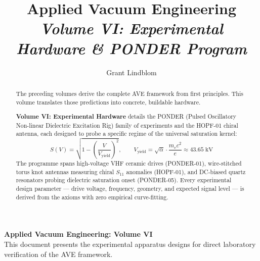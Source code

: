\title{\textbf{Applied Vacuum Engineering} \\ \large \textit{Volume VI: Experimental Hardware \& PONDER Program}}
\author{Grant Lindblom}
\date{}

\maketitle

\vfill
\noindent\textbf{Applied Vacuum Engineering: Volume VI} \\
This document presents the experimental apparatus designs for direct laboratory verification of the AVE framework.

\begin{abstract}
    The preceding volumes derive the complete AVE framework from first principles. This volume translates those predictions into concrete, buildable hardware.

    \textbf{Volume VI: Experimental Hardware} details the PONDER (Pulsed Oscillatory Non-linear Dielectric Excitation Rig) family of experiments and the HOPF-01 chiral antenna, each designed to probe a specific regime of the universal saturation kernel:
    \begin{equation}
        S(V) = \sqrt{1 - \left(\frac{V}{V_\text{yield}}\right)^{\!2}}, \qquad V_\text{yield} = \sqrt{\alpha} \cdot \frac{m_e c^2}{e} \approx 43.65\;\text{kV}
    \end{equation}
    The programme spans high-voltage VHF ceramic drives (PONDER-01), wire-stitched torus knot antennas measuring chiral $S_{11}$ anomalies (HOPF-01), and DC-biased quartz resonators probing dielectric saturation onset (PONDER-05). Every experimental design parameter --- drive voltage, frequency, geometry, and expected signal level --- is derived from the axioms with zero empirical curve-fitting.
\end{abstract}

